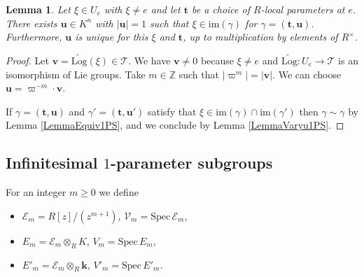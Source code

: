 \documentclass[11pt]{amsart}
\newtheorem{lemma}[theorem]{Lemma}
\theoremstyle{remark}
\numberwithin{equation}{section}
\newcommand{\Ecal}{\mathscr{E}}
\newcommand{\Tcal}{\mathscr{T}}
\newcommand{\Vcal}{\mathscr{V}}
\newcommand{\Z}{\mathbb{Z}}
\newcommand{\kk}{\mathbf{k}}
\newcommand{\ttt}{\mathbf{t}}
\newcommand{\vv}{\mathbf{v}}
\newcommand{\uu}{\mathbf{u}}
\newcommand{\Spec}{\mathrm{Spec}\,}
\newcommand{\Log}{\mathrm{Log}}
\newcommand{\im}{\mathrm{im}}
\begin{document}
\begin{lemma}\label{Lemma1PSgen} Let $\xi\in U_e$ with $\xi\ne e$ and let $\ttt$ be a choice of $R$-local parameters at $e$. There exists $\uu\in K^n$ with $|\uu|=1$ such that $\xi \in \im(\gamma)$ for $\gamma=(\ttt,\uu)$. Furthermore, $\uu$ is unique for this $\xi$ and $\ttt$, up to multiplication by elements of $R^\times$.
\end{lemma}
\begin{proof} Let $\vv=\widetilde{\Log}(\xi)\in \Tcal$. We have $\vv\ne 0$ because $\xi\ne e$ and $\widetilde{\Log}:U_e\to \Tcal$ is an isomorphism of Lie groups. Take $m\in \Z$ such that $|\varpi^m|=|\vv|$. We can choose $\uu=\varpi^{-m}\cdot \vv$. 

If $\gamma=(\ttt,\uu)$ and $\gamma'=(\ttt,\uu')$ satisfy that $\xi\in \im(\gamma)\cap\im(\gamma')$ then $\gamma\sim\gamma$ by Lemma \ref{LemmaEquiv1PS}, and we conclude by Lemma \ref{LemmaVaryu1PS}.
\end{proof}
\subsection{Infinitesimal $1$-parameter subgroups} For an integer $m\ge 0$ we define 
\begin{itemize}
\item $\Ecal_m= R[z]/(z^{m+1})$, $\Vcal_m=\Spec \Ecal_m$, 
\item $E_m=\Ecal_m\otimes_R K$, $V_m=\Spec E_m$, 
\item $E'_m=\Ecal_m\otimes_R \kk$, $V'_m=\Spec E'_m$.
\end{itemize}
\end{document}

